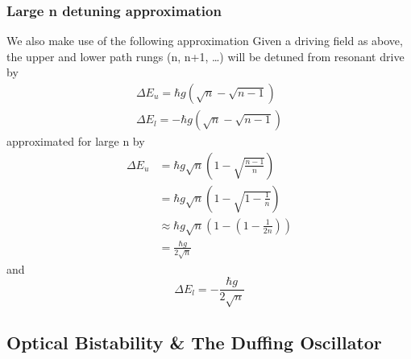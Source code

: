 \subsubsection{Large n detuning approximation}
We also make use of the following approximation \cite{Alsing1990}
Given a driving field as above, the upper and lower path rungs (n, n+1, \dots) will be detuned from resonant drive by
\begin{align}
  \Delta E_u = \hbar g (\sqrt{n}-\sqrt{n-1}) \\
  \Delta E_l = -\hbar g (\sqrt{n}-\sqrt{n-1})
\end{align}
approximated for large n by
\begin{align}
  \Delta E_u &= \hbar g \sqrt{n} \left (1-\sqrt{\frac{n-1}{n}} \right ) \\
  &= \hbar g \sqrt{n} \left (1-\sqrt{1-\frac{1}{n}} \right ) \\
  & \approx \hbar g \sqrt{n} \left ( 1- \left ( 1 - \frac{1}{2n} \right ) \right ) \\
  &= \frac{\hbar g}{2 \sqrt{n}}
\end{align}
and
\begin{equation}
  \Delta E_l = -\frac{\hbar g}{2 \sqrt{n}}
\end{equation}
\subsection{Optical Bistability \& The Duffing Oscillator}
\cite{Agrawal1979}

